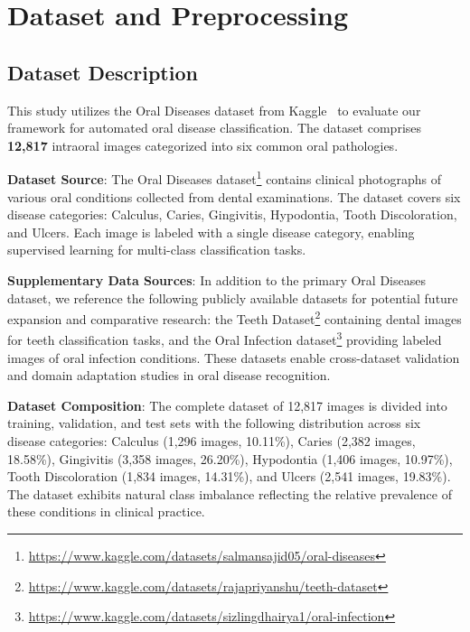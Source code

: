 \section{Dataset and Preprocessing}
\label{sec:dataset}

\subsection{Dataset Description}

This study utilizes the Oral Diseases dataset from Kaggle~\cite{kaggle_oral_diseases} to evaluate our framework for automated oral disease classification. The dataset comprises \textbf{12,817} intraoral images categorized into six common oral pathologies.

\textbf{Dataset Source}: The Oral Diseases dataset\footnote{\url{https://www.kaggle.com/datasets/salmansajid05/oral-diseases}} contains clinical photographs of various oral conditions collected from dental examinations. The dataset covers six disease categories: Calculus, Caries, Gingivitis, Hypodontia, Tooth Discoloration, and Ulcers. Each image is labeled with a single disease category, enabling supervised learning for multi-class classification tasks.

\textbf{Supplementary Data Sources}: In addition to the primary Oral Diseases dataset, we reference the following publicly available datasets for potential future expansion and comparative research: the Teeth Dataset\footnote{\url{https://www.kaggle.com/datasets/rajapriyanshu/teeth-dataset}} containing dental images for teeth classification tasks, and the Oral Infection dataset\footnote{\url{https://www.kaggle.com/datasets/sizlingdhairya1/oral-infection}} providing labeled images of oral infection conditions. These datasets enable cross-dataset validation and domain adaptation studies in oral disease recognition.

\textbf{Dataset Composition}: The complete dataset of 12,817 images is divided into training, validation, and test sets with the following distribution across six disease categories: Calculus (1,296 images, 10.11\%), Caries (2,382 images, 18.58\%), Gingivitis (3,358 images, 26.20\%), Hypodontia (1,406 images, 10.97\%), Tooth Discoloration (1,834 images, 14.31\%), and Ulcers (2,541 images, 19.83\%). The dataset exhibits natural class imbalance reflecting the relative prevalence of these conditions in clinical practice.

